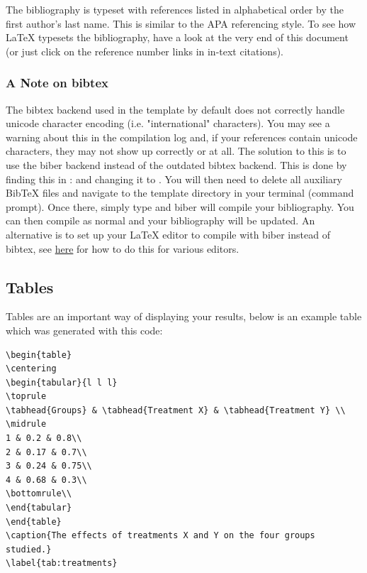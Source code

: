 The bibliography is typeset with references listed in alphabetical order by the first author's last name. This is similar to the APA referencing style. To see how \LaTeX{} typesets the bibliography, have a look at the very end of this document (or just click on the reference number links in in-text citations).

\subsubsection{A Note on bibtex}

The bibtex backend used in the template by default does not correctly handle unicode character encoding (i.e. "international" characters). You may see a warning about this in the compilation log and, if your references contain unicode characters, they may not show up correctly or at all. The solution to this is to use the biber backend instead of the outdated bibtex backend. This is done by finding this in :  and changing it to . You will then need to delete all auxiliary BibTeX files and navigate to the template directory in your terminal (command prompt). Once there, simply type  and biber will compile your bibliography. You can then compile  as normal and your bibliography will be updated. An alternative is to set up your LaTeX editor to compile with biber instead of bibtex, see \href{http://tex.stackexchange.com/questions/154751/biblatex-with-biber-configuring-my-editor-to-avoid-undefined-citations/}{here} for how to do this for various editors.

\subsection{Tables}

Tables are an important way of displaying your results, below is an example table which was generated with this code:

{\small
\begin{verbatim}
\begin{table}
\centering
\begin{tabular}{l l l}
\toprule
\tabhead{Groups} & \tabhead{Treatment X} & \tabhead{Treatment Y} \\
\midrule
1 & 0.2 & 0.8\\
2 & 0.17 & 0.7\\
3 & 0.24 & 0.75\\
4 & 0.68 & 0.3\\
\bottomrule\\
\end{tabular}
\end{table}
\caption{The effects of treatments X and Y on the four groups studied.}
\label{tab:treatments}
\end{verbatim}
}


